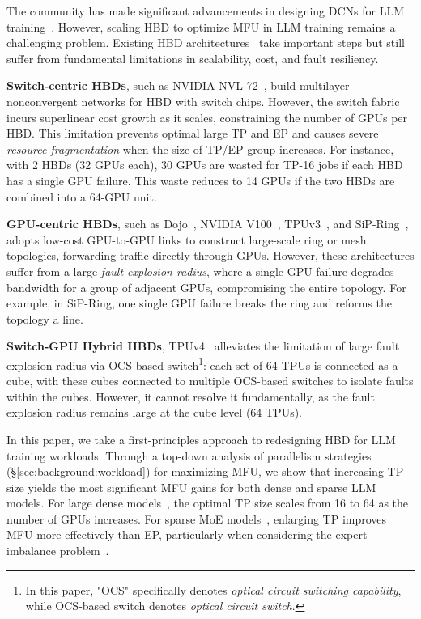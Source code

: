 The community has made significant advancements in designing DCNs for LLM training~\cite{wang2024railonly, sigcomm2024hpn,rail-optimized,sigcomm2024meta}. However, scaling HBD to optimize MFU in LLM training remains a challenging problem. Existing HBD architectures~\cite{nvl72,isca2023tpu,dojo,cacm2020tpuv3,aws-trainium} take important steps but still suffer from fundamental limitations in scalability, cost, and fault resiliency. 
\begin{packeditemize}
    \item \textbf{Switch-centric HBDs}, such as NVIDIA NVL-72~\cite{nvl72}, build multilayer nonconvergent networks for HBD with switch chips. However, the switch fabric incurs superlinear cost growth as it scales, constraining the number of GPUs per HBD. This limitation prevents optimal large TP and EP and causes severe \textit{resource fragmentation} when the size of TP/EP group increases. For instance, with 2 HBDs (32 GPUs each), 30 GPUs are wasted for TP-16 jobs if each HBD has a single GPU failure. This waste reduces to 14 GPUs if the two HBDs are combined into a 64-GPU unit. 
    \item \textbf{GPU-centric HBDs}, such as Dojo~\cite{dojo}, NVIDIA V100~\cite{v100}, TPUv3~\cite{cacm2020tpuv3}, and SiP-Ring~\cite{sip-ml}, adopts low-cost GPU-to-GPU links to construct large-scale ring or mesh topologies, forwarding traffic directly through GPUs. However, these architectures suffer from a large \textit{fault explosion radius}, where a single GPU failure degrades bandwidth for a group of adjacent GPUs, compromising the entire topology. For example, in SiP-Ring, one single GPU failure breaks the ring and reforms the topology a line. 
    \item \textbf{Switch-GPU Hybrid HBDs}, TPUv4~\cite{isca2023tpu} alleviates the limitation of large fault explosion radius via OCS-based switch\footnote{In this paper, "OCS" specifically denotes \textit{optical circuit switching capability}, while OCS-based switch denotes \textit{optical circuit switch}.}: each set of 64 TPUs is connected as a cube, with these cubes connected to multiple OCS-based switches to isolate faults within the cubes. However, it cannot resolve it fundamentally, as the fault explosion radius remains large at the cube level (64 TPUs).
\end{packeditemize}




In this paper, we take a first-principles approach to redesigning HBD for LLM training workloads.
Through a top-down analysis of parallelism strategies (\S\ref{sec:background:workload})  for maximizing MFU, we show that increasing TP size yields the most significant MFU gains for both dense and sparse LLM models. For large dense models~\cite{llama3herdmodels}, the optimal TP size scales from 16 to 64 as the number of GPUs increases. For sparse MoE models~\cite{hunyuanlarge,deepseekv3,mixtralexperts}, enlarging TP improves MFU more effectively than EP, particularly when considering the expert imbalance problem~\cite{sigcomm2023_janus}.

